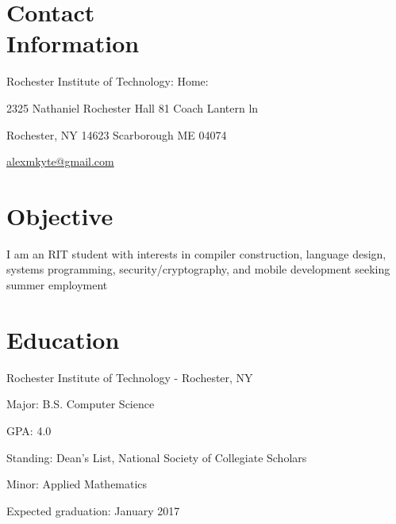 \documentclass[letter,margin,line]{resume}
\begin{document}
\begin{resume}
\section{\mysidestyle Contact \\ Information} \vspace{2mm}
	\begin{asparablank}
		\item Rochester Institute of Technology: \hfill Home: \hfill
		\item 2325 Nathaniel Rochester Hall \hfill 81 Coach Lantern ln \hfill
		\item Rochester, NY 14623 \hfill Scarborough ME 04074 \hfill
		\\		
		\item\href{mailto:alexmkyte@gmail.com}{alexmkyte@gmail.com} \hfill
	\end{asparablank}

\section{\mysidestyle Objective} \vspace{2mm}
	\begin{asparablank} 
	\item I am an RIT student with interests in compiler construction, language design, systems programming, security/cryptography, and mobile development seeking summer employment 
	 \end{asparablank}

\section{\mysidestyle Education}
	\begin{compactdesc}
		\item[Rochester Institute of Technology] - Rochester, NY 
		\begin{compactitem} { \small
			\item Major: B.S. Computer Science
			\item GPA: 4.0
			\item Standing: Dean's List, National Society of Collegiate Scholars
			\item Minor: Applied Mathematics
			\item Expected graduation: January 2017
		} \end{compactitem}
	\end{compactdesc}


\end{resume}
\end{document}
